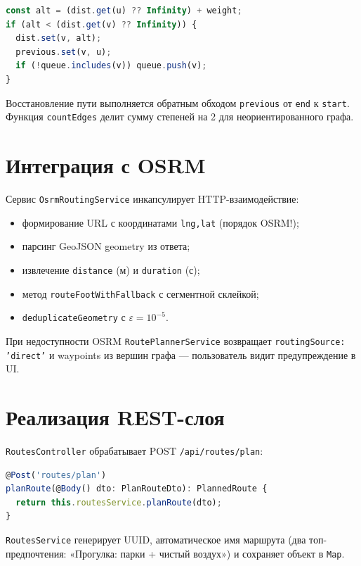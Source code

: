 \begin{lstlisting}[language=TypeScript,caption={Релаксация ребра в Dijkstra},label={lst:dijkstra-relax}]
const alt = (dist.get(u) ?? Infinity) + weight;
if (alt < (dist.get(v) ?? Infinity)) {
  dist.set(v, alt);
  previous.set(v, u);
  if (!queue.includes(v)) queue.push(v);
}
\end{lstlisting}

Восстановление пути выполняется обратным обходом \texttt{previous} от \texttt{end}
к \texttt{start}. Функция \texttt{countEdges} делит сумму степеней на 2 для
неориентированного графа.

\section{Интеграция с OSRM}

Сервис \texttt{OsrmRoutingService} инкапсулирует HTTP-взаимодействие:
\begin{itemize}
  \item формирование URL с координатами \texttt{lng,lat} (порядок OSRM!);
  \item парсинг GeoJSON geometry из ответа;
  \item извлечение \texttt{distance} (м) и \texttt{duration} (с);
  \item метод \texttt{routeFootWithFallback} с сегментной склейкой;
  \item \texttt{deduplicateGeometry} с $\varepsilon = 10^{-5}$.
\end{itemize}

При недоступности OSRM \texttt{RoutePlannerService} возвращает
\texttt{routingSource: 'direct'} и waypoints из вершин графа --- пользователь
видит предупреждение в UI.

\section{Реализация REST-слоя}

\texttt{RoutesController} обрабатывает POST \texttt{/api/routes/plan}:

\begin{lstlisting}[language=TypeScript,caption={Фрагмент контроллера},label={lst:controller}]
@Post('routes/plan')
planRoute(@Body() dto: PlanRouteDto): PlannedRoute {
  return this.routesService.planRoute(dto);
}
\end{lstlisting}

\texttt{RoutesService} генерирует UUID, автоматическое имя маршрута
(два топ-предпочтения: «Прогулка: парки + чистый воздух») и сохраняет объект
в \texttt{Map}.

